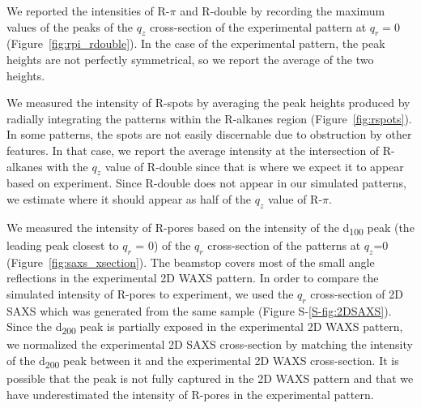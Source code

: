 \documentclass[journal=jpcbfk,manuscript=article]{achemso}
\begin{document}

  We reported the intensities of R-$\pi$ and R-double by recording the maximum values
  of the peaks of the $q_z$ cross-section of the experimental pattern at $q_r=0$ 
  (Figure~\ref{fig:rpi_rdouble}). In the case of the experimental pattern, the peak
  heights are not perfectly symmetrical, so we report the average of the two heights.

  We measured the intensity of R-spots by averaging the peak heights produced
  by radially integrating the patterns within the R-alkanes region
  (Figure~\ref{fig:rspots}).  In some patterns, the spots are not easily
  discernable due to obstruction by other features. In that case, we report the
  average intensity at the intersection of R-alkanes with the $q_z$ value of
  R-double since that is where we expect it to appear based on experiment. Since
  R-double does not appear in our simulated patterns, we estimate where it should
  appear as half of the $q_z$ value of R-$\pi$.


  We measured the intensity of R-pores based on the intensity of the
  d\textsubscript{100} peak (the leading peak closest to $q_r$ = 0) of the $q_r$
  cross-section of the patterns at $q_z$=0 (Figure~\ref{fig:saxs_xsection}). The
  beamstop covers most of the small angle reflections in the experimental 2D WAXS
  pattern. In order to compare the simulated intensity of R-pores to experiment,
  we used the $q_r$ cross-section of 2D SAXS which was generated from the same
  sample (Figure S-\ref{S-fig:2DSAXS}). Since the d\textsubscript{200} peak is
  partially exposed in the experimental 2D WAXS pattern, we normalized the
  experimental 2D SAXS cross-section by matching the intensity of the
  d\textsubscript{200} peak between it and the experimental 2D WAXS
  cross-section. It is possible that the peak is not fully captured in the 2D
  WAXS pattern and that we have underestimated the intensity of R-pores in the
  experimental pattern.     
\end{document}
